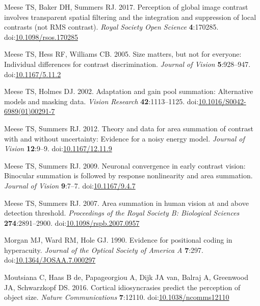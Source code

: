 \documentclass[
]{article}
\newlength{\cslhangindent}
\newlength{\cslentryspacingunit} %
\newenvironment{CSLReferences}[2] %
 {%
  \setlength{\parindent}{0pt}
  \ifodd #1
  \let\oldpar\par
  \def\par{\hangindent=\cslhangindent\oldpar}
  \fi
  \setlength{\parskip}{#2\cslentryspacingunit}
 }%
 {}
\begin{document}
\begin{CSLReferences}{1}{0}
\leavevmode{}%
Meese TS, Baker DH, Summers RJ. 2017. Perception of global image contrast involves transparent spatial filtering and the integration and suppression of local contrasts (not RMS contrast). \emph{Royal Society Open Science} \textbf{4}:170285. doi:\href{https://doi.org/10.1098/rsos.170285}{10.1098/rsos.170285}

\leavevmode{}%
Meese TS, Hess RF, Williams CB. 2005. Size matters, but not for everyone: Individual differences for contrast discrimination. \emph{Journal of Vision} \textbf{5}:928--947. doi:\href{https://doi.org/10.1167/5.11.2}{10.1167/5.11.2}

\leavevmode{}%
Meese TS, Holmes DJ. 2002. Adaptation and gain pool summation: Alternative models and masking data. \emph{Vision Research} \textbf{42}:1113--1125. doi:\href{https://doi.org/10.1016/S0042-6989(01)00291-7}{10.1016/S0042-6989(01)00291-7}

\leavevmode{}%
Meese TS, Summers RJ. 2012. Theory and data for area summation of contrast with and without uncertainty: Evidence for a noisy energy model. \emph{Journal of Vision} \textbf{12}:9--9. doi:\href{https://doi.org/10.1167/12.11.9}{10.1167/12.11.9}

\leavevmode{}%
Meese TS, Summers RJ. 2009. Neuronal convergence in early contrast vision: Binocular summation is followed by response nonlinearity and area summation. \emph{Journal of Vision} \textbf{9}:7--7. doi:\href{https://doi.org/10.1167/9.4.7}{10.1167/9.4.7}

\leavevmode{}%
Meese TS, Summers RJ. 2007. Area summation in human vision at and above detection threshold. \emph{Proceedings of the Royal Society B: Biological Sciences} \textbf{274}:2891--2900. doi:\href{https://doi.org/10.1098/rspb.2007.0957}{10.1098/rspb.2007.0957}

\leavevmode{}%
Morgan MJ, Ward RM, Hole GJ. 1990. Evidence for positional coding in hyperacuity. \emph{Journal of the Optical Society of America A} \textbf{7}:297. doi:\href{https://doi.org/10.1364/JOSAA.7.000297}{10.1364/JOSAA.7.000297}

\leavevmode{}%
Moutsiana C, Haas B de, Papageorgiou A, Dijk JA van, Balraj A, Greenwood JA, Schwarzkopf DS. 2016. Cortical idiosyncrasies predict the perception of object size. \emph{Nature Communications} \textbf{7}:12110. doi:\href{https://doi.org/10.1038/ncomms12110}{10.1038/ncomms12110}


\end{CSLReferences}
\end{document}
